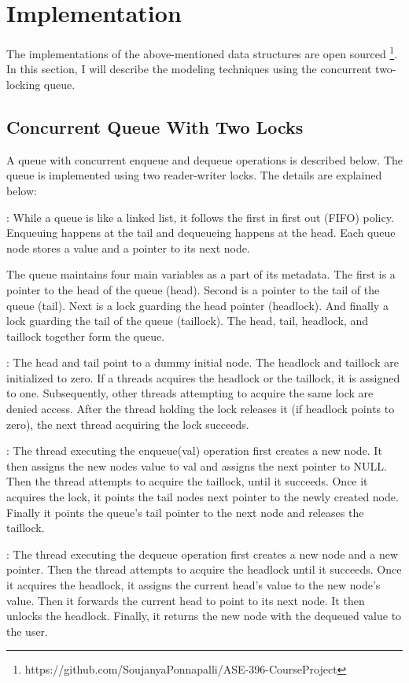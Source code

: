 \section{Implementation}

The implementations of the above-mentioned data structures are open sourced
\footnote{https://github.com/SoujanyaPonnapalli/ASE-396-CourseProject}.
In this section, I will describe the modeling techniques using the
concurrent two-locking queue.

\subsection{Concurrent Queue With Two Locks}
A queue with concurrent enqueue and dequeue operations is described below.
The queue is implemented using two reader-writer locks. The details are
explained below:

:
While a queue is like a linked list, it follows the first in first out (FIFO)
policy. Enqueuing happens at the tail and dequeueing happens at the head. Each
queue node stores a value and a pointer to its next node.

The queue maintains four main variables as a part
of its metadata. The first is a pointer to the head of the queue (head). Second is
a pointer to the tail of the queue (tail). Next is a lock guarding the head pointer
(headlock). And finally a lock guarding the tail of the queue (taillock). The head,
tail, headlock, and taillock together form the queue.

:
The head and tail point to a dummy initial node. The headlock and taillock are
initialized to zero. If a threads acquires the headlock or the taillock, it is
assigned to one. Subsequently, other threads attempting to acquire the same
lock are denied access. After the thread holding the lock releases it (if headlock
points to zero), the next thread acquiring the lock succeeds.

: The thread executing the enqueue(val) operation first creates
a new node. It then assigns the new nodes value to val and assigns the next pointer
to NULL. Then the thread attempts to acquire the taillock, until it succeeds. Once
it acquires the lock, it points the tail nodes next pointer to the newly created node.
Finally it points the queue's tail pointer to the next node and releases the taillock.

: The thread executing the dequeue operation first creates a new node
and a new pointer. Then the thread attempts to acquire the headlock until it succeeds.
Once it acquires the headlock, it assigns the current head's value to the new node's
value. Then it forwards the current head to point to its next node. It then unlocks the
headlock. Finally, it returns the new node with the dequeued value to the user.

